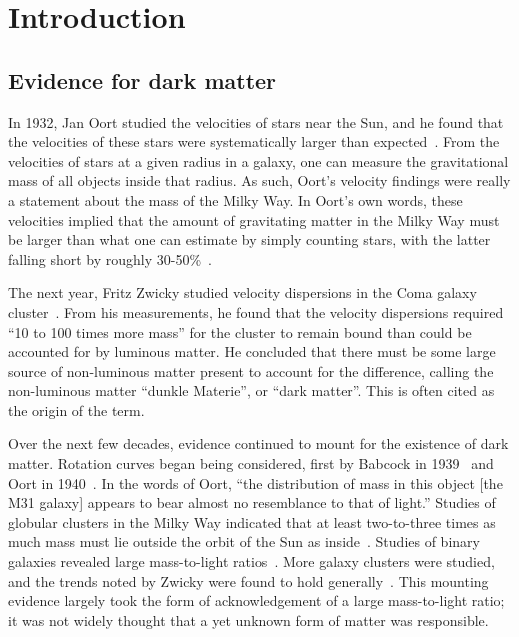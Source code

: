 \hypertarget{lambda-cdm}{%
\chapter{Introduction}\label{lambda-cdm}}

\hypertarget{evidence-for-dark-matter}{%
\section{Evidence for dark matter}\label{evidence-for-dark-matter}}

In 1932, Jan Oort studied the velocities of stars near the Sun, and he found
that the velocities of these stars were systematically larger than
expected~\cite{oort_force_1932}. From the velocities of stars at a given
radius in a galaxy, one can measure the gravitational mass of all objects
inside that radius. As such, Oort's velocity findings were really a statement
about the mass of the Milky Way. In Oort's own words, these velocities implied
that the amount of gravitating matter in the Milky Way must be larger than
what one can estimate by simply counting stars, with the latter falling short
by roughly 30-50\%~\cite{trimble_existence_1987}.

The next year, Fritz Zwicky studied velocity dispersions in the Coma galaxy
cluster~\cite{zwicky_rotverschiebung_1933,andernach_english_2017}. From his
measurements, he found that the velocity dispersions required ``10 to 100
times more mass'' for the cluster to remain bound than could be accounted for
by luminous matter. He concluded that there must be some large source of
non-luminous matter present to account for the difference, calling the
non-luminous matter ``dunkle Materie'', or ``dark matter''. This is often
cited as the origin of the term.

Over the next few decades, evidence continued to mount for the existence of
dark matter. Rotation curves began being considered, first by Babcock in
1939~\cite{babcock_rotation_1939} and Oort in 1940~\cite{oort_problems_1940}.
In the words of Oort, ``the distribution of mass in this object [the M31
galaxy] appears to bear almost no resemblance to that of light.'' Studies of
globular clusters in the Milky Way indicated that at least two-to-three times
as much mass must lie outside the orbit of the Sun as
inside~\cite{lohmann_masse_1956}.  Studies of binary galaxies revealed large
mass-to-light ratios~\cite{page_average_1960,holmberg_masses_1954}.  More
galaxy clusters were studied, and the trends noted by Zwicky were found to
hold generally~\cite{trimble_history_2013}.  This mounting evidence largely
took the form of acknowledgement of a large mass-to-light ratio; it was not
widely thought that a yet unknown form of matter was responsible.

